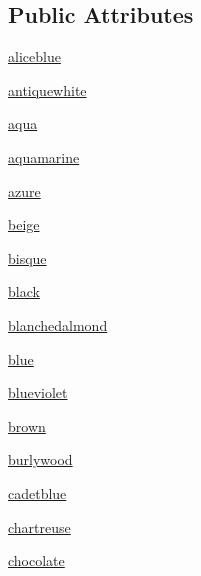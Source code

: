 \subsection*{Public Attributes}
\begin{DoxyCompactItemize}
\item 
\mbox{\hyperlink{enumbridges_1_1base_1_1_named_color_a8d2d3904e6e7f1f6a144365d6fae6b92}{aliceblue}}
\item 
\mbox{\hyperlink{enumbridges_1_1base_1_1_named_color_a49d6e6cad9f1f9c88e2c59eafa78c45c}{antiquewhite}}
\item 
\mbox{\hyperlink{enumbridges_1_1base_1_1_named_color_afe730da1bd9445649a3bb994d3ae6363}{aqua}}
\item 
\mbox{\hyperlink{enumbridges_1_1base_1_1_named_color_a03e600a15631eec7a17cc26ab5a43c04}{aquamarine}}
\item 
\mbox{\hyperlink{enumbridges_1_1base_1_1_named_color_af0ae4fa86b6735a98706ad6c9e898062}{azure}}
\item 
\mbox{\hyperlink{enumbridges_1_1base_1_1_named_color_ad9479f9ff118db34498fe7533a75c416}{beige}}
\item 
\mbox{\hyperlink{enumbridges_1_1base_1_1_named_color_a7cc4c88e0b4f87d4dbfb577cb533c85e}{bisque}}
\item 
\mbox{\hyperlink{enumbridges_1_1base_1_1_named_color_a504b5b12927b738c0f059332e3dc86a4}{black}}
\item 
\mbox{\hyperlink{enumbridges_1_1base_1_1_named_color_a5abdb4bb3f12aa90c0428389f44acaff}{blanchedalmond}}
\item 
\mbox{\hyperlink{enumbridges_1_1base_1_1_named_color_acb31421a17c79934017ff12619686585}{blue}}
\item 
\mbox{\hyperlink{enumbridges_1_1base_1_1_named_color_a4537ee0ae0ccfd3f35acbacbf9dc6ac0}{blueviolet}}
\item 
\mbox{\hyperlink{enumbridges_1_1base_1_1_named_color_a0d2ef5626f9eb4b338eb6b8bb48feaff}{brown}}
\item 
\mbox{\hyperlink{enumbridges_1_1base_1_1_named_color_a8a958193b6e8c98e57771530ac03c07c}{burlywood}}
\item 
\mbox{\hyperlink{enumbridges_1_1base_1_1_named_color_a90675a32f4ac50199c689fd57d971f24}{cadetblue}}
\item 
\mbox{\hyperlink{enumbridges_1_1base_1_1_named_color_a8fd106d773ffb0338f5793421078b117}{chartreuse}}
\item 
\mbox{\hyperlink{enumbridges_1_1base_1_1_named_color_aee60d632523ad71da082647dd8cb5a37}{chocolate}}
\item 

\end{DoxyCompactItemize}

